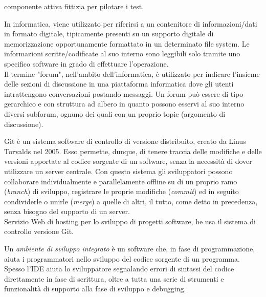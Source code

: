 \documentclass{scalatekids-article}
\begin{document}
 componente attiva fittizia per pilotare i test.
\\



 In informatica, viene utilizzato per riferirsi a un contenitore di informazioni/dati in formato digitale, tipicamente presenti su un supporto digitale di memorizzazione opportunamente formattato in un determinato file system.
Le informazioni scritte/codificate al suo interno sono leggibili solo tramite uno specifico software in grado di effettuare l'operazione.
\\

 Il termine "forum", nell'ambito dell'informatica, è utilizzato per indicare l'insieme delle sezioni di discussione in una piattaforma informatica dove gli utenti intrattengono conversazioni postando messaggi.
Un forum può essere di tipo gerarchico e con struttura ad albero in quanto possono esservi al suo interno diversi subforum, ognuno dei quali con un proprio topic (argomento di discussione).
\\


 Git è un sistema software di controllo di versione distribuito, creato da Linus Torvalds nel 2005.
Esso permette, dunque, di tenere traccia delle modifiche e delle versioni apportate al codice sorgente di un software, senza la necessità di dover utilizzare un server centrale.
Con questo sistema gli sviluppatori possono collaborare individualmente e parallelamente offline su di un proprio ramo (\textit{branch}) di sviluppo, registrare le proprie modifiche (\textit{commit}) ed in seguito condividerle o unirle (\textit{merge}) a quelle di altri, il tutto, come detto in precedenza, senza bisogno del supporto di un server.
\\

 Servizio Web di hosting per lo sviluppo di progetti software, he usa il sistema di controllo  versione Git.
\\



 Un \textit{ambiente di sviluppo integrato} è un software che, in fase di programmazione, aiuta i programmatori nello sviluppo del codice sorgente di un programma. Spesso l'IDE aiuta lo sviluppatore segnalando errori di sintassi del codice direttamente in fase di scrittura, oltre a tutta una serie di strumenti e funzionalità di supporto alla fase di sviluppo e debugging.
\\
\end{document}
